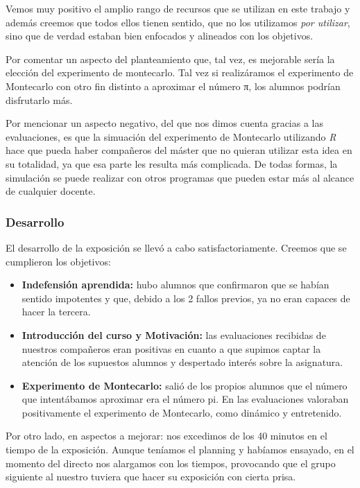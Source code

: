 Vemos muy positivo el amplio rango de recursos que se utilizan en este trabajo y además creemos que todos ellos tienen sentido, que no los utilizamos \textit{por utilizar}, sino que de verdad estaban bien enfocados y alineados con los objetivos.

Por comentar un aspecto del planteamiento que, tal vez, es mejorable sería la elección del experimento de montecarlo.
%
Tal vez si realizáramos el experimento de Montecarlo con otro fin distinto a aproximar el número π, los alumnos podrían disfrutarlo más.

Por mencionar un aspecto negativo, del que nos dimos cuenta gracias a las evaluaciones, es que la simuación del experimento de Montecarlo utilizando \textit{R} hace que pueda haber compañeros del máster que no quieran utilizar esta idea en su totalidad, ya que esa parte les resulta más complicada.
%
De todas formas, la simulación se puede realizar con otros programas que pueden estar más al alcance de cualquier docente.

\subsubsection{Desarrollo}

El desarrollo de la exposición se llevó a cabo satisfactoriamente.
%
Creemos que se cumplieron los objetivos:
\begin{itemize}
	\item \textbf{Indefensión aprendida:} hubo alumnos que confirmaron que se habían sentido impotentes y que, debido a los 2 fallos previos, ya no eran capaces de hacer la tercera.
	\item \textbf{Introducción del curso y Motivación:} las evaluaciones recibidas de nuestros compañeros eran positivas en cuanto a que supimos captar la atención de los supuestos alumnos y despertado interés sobre la asignatura.
	\item \textbf{Experimento de Montecarlo:} salió de los propios alumnos que el número que intentábamos aproximar era el número pi.
	En las evaluaciones valoraban positivamente el experimento de Montecarlo, como dinámico y entretenido.
\end{itemize}

Por otro lado, en aspectos a mejorar: nos excedimos de los 40 minutos en el tiempo de la exposición. 
%
Aunque teníamos el planning y habíamos ensayado, en el momento del directo nos alargamos con los tiempos, provocando que el grupo siguiente al nuestro tuviera que hacer su exposición con cierta prisa.


